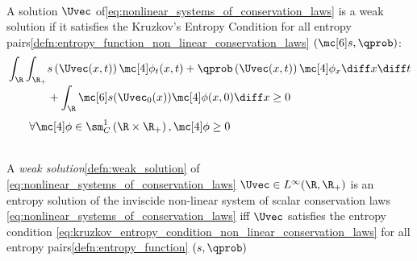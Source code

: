 \begin{corbox}\nospacing
    \begin{cor}
        \label{cor:entropy_condition_for_distributions_non_linear_conservation_laws}\leavevmode\\
          A solution $\Uvec$ of\cref{eq:nonlinear_systems_of_conservation_laws} is a weak solution
          if it satisfies the Kruzkov's Entropy Condition for all entropy pairs\cref{defn:entropy_function_non_linear_conservation_laws} $(\entropy,\qprob)$:
          \begin{align}
            \int_{\R}\int_{\R_{+}}&s \left(\Uvec(x,t)\right)\testfunc_{t}(x,t)+\qprob\left(\Uvec(x,t)\right)\testfunc_{x}\diff x\diff t\nonumber \\[-1\jot]
            &+\int_{\R}\entropy(\Uvec_{0}(x))\testfunc(x,0)\diff x\geq0\label{eq:kruzkov_entropy_condition_non_linear_conservation_laws}
          \end{align}
          \hfill$\qquad\forall\testfunc\in\sm_{C}^{1}\left(\R\times\R_{+}\right),\testfunc\geq0\nonumber$
    \end{cor}
\end{corbox}
\begin{defnbox}\nospacing
    \begin{defn}\label{defn:entropy_solution_non_linear_conservation_laws}\leavevmode\\
        A \textit{weak solution}\cref{defn:weak_solution} of \cref{eq:nonlinear_systems_of_conservation_laws} $\Uvec\in L^{\infty}(\R,\R_{+})$
        is an entropy solution of the inviscide non-linear system of scalar conservation laws \cref{eq:nonlinear_systems_of_conservation_laws} iff
        $\Uvec$ satisfies the entropy condition \cref{eq:kruzkov_entropy_condition_non_linear_conservation_laws} for all entropy pairs\cref{defn:entropy_function} $(s,\qprob)$
    \end{defn}
\end{defnbox}
